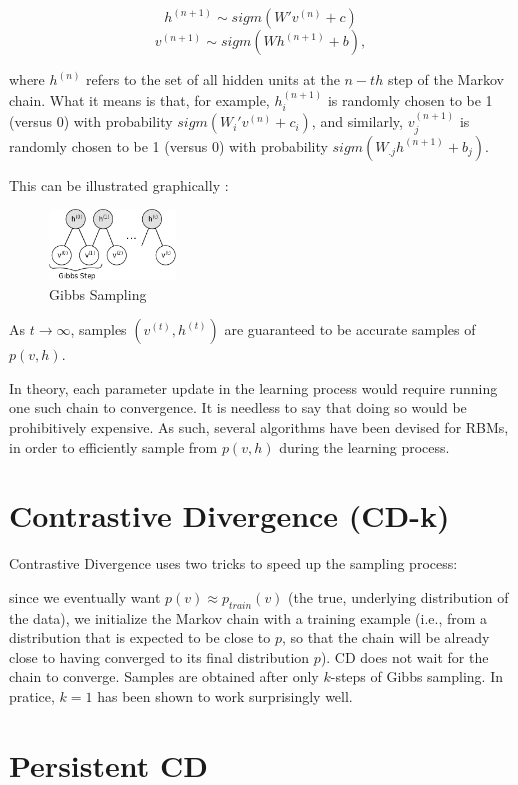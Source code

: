 \documentclass[12pt]{article}
\begin{document}
\[h^{(n+1)} \sim sigm(W'v^{(n)} + c)\] 
\[v^{(n+1)} \sim sigm(W h^{(n+1)} + b),\]

where $h^{(n)}$ refers to the set of all hidden units at the $n-th$ step of the Markov chain. What it means is that, for example, $h^{(n+1)}_i$ is randomly chosen to be 1 (versus 0) with probability $sigm(W_i'v^{(n)} + c_i)$, and similarly, $v^{(n+1)}_j$ is randomly chosen to be 1 (versus 0) with probability $sigm(W_{.j} h^{(n+1)} + b_j)$.

This can be illustrated graphically :
\begin{figure}
	\centering
	\includegraphics[width=0.3\textwidth]
		{pics/markov_chain.png}
	\caption{Gibbs Sampling}
	\label{fig:markov_chain}
\end{figure}


As $t \rightarrow \infty$, samples $(v^{(t)}, h^{(t)})$ are guaranteed to be accurate samples of $p(v,h)$.

In theory, each parameter update in the learning process would require running one such chain to convergence. It is needless to say that doing so would be prohibitively expensive. As such, several algorithms have been devised for RBMs, in order to efficiently sample from $p(v,h)$ during the learning process.

\section{Contrastive Divergence (CD-k)}

Contrastive Divergence uses two tricks to speed up the sampling process:

since we eventually want $p(v) \approx p_{train}(v)$ (the true, underlying distribution of the data), we initialize the Markov chain with a training example (i.e., from a distribution that is expected to be close to $p$, so that the chain will be already close to having converged to its final distribution $p$).
CD does not wait for the chain to converge. Samples are obtained after only $k$-steps of Gibbs sampling. In pratice, $k=1$ has been shown to work surprisingly well.
\section{Persistent CD}
\end{document}
